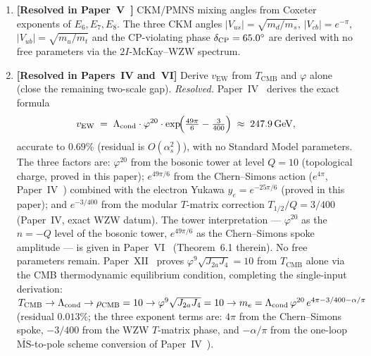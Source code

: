 \documentclass[11pt,a4paper]{article}
\theoremstyle{definition}
\theoremstyle{remark}
\newcommand{\vp}{\varphi}
\newcommand{\Ja}{J_{2a}}
\newcommand{\Jfour}{J_{4}}
\newcommand{\TCMB}{T_{\mathrm{CMB}}}
\newcommand{\vEW}{v_{\mathrm{EW}}}
\newcommand{\Lcond}{\Lambda_{\mathrm{cond}}}
\begin{document}
\begin{enumerate}[noitemsep]
      differently in the tower.
  \item \textbf{[Resolved in Paper~V~\cite{Paper5}]}
    CKM/PMNS mixing angles from Coxeter exponents of $E_6,E_7,E_8$.
    The three CKM angles $|V_{us}|=\sqrt{m_d/m_s}$,
    $|V_{cb}|=e^{-\pi}$, $|V_{ub}|=\sqrt{m_u/m_t}$ and
    the CP-violating phase $\delta_{\rm CP}=65.0^\circ$
    are derived with no free parameters via the $2I$-McKay--WZW spectrum.
  \item \textbf{[Resolved in Papers~IV and~VI]} Derive $\vEW$ from $\TCMB$
    and $\vp$ alone (close the remaining two-scale gap).
    \emph{Resolved.}
    Paper~IV~\cite{Paper4} derives the exact formula
    \begin{equation*}
      \vEW \;=\; \Lcond\cdot\vp^{20}\cdot
      \exp\!\Bigl(\tfrac{49\pi}{6} - \tfrac{3}{400}\Bigr)
      \;\approx\; 247.9\,\mathrm{GeV},
    \end{equation*}
    accurate to $0.69\%$ (residual is $O(\alpha_s^2)$), with no Standard
    Model parameters.
    The three factors are: $\vp^{20}$ from the bosonic tower at level
    $Q=10$ (topological charge, proved in this paper); $e^{49\pi/6}$
    from the Chern--Simons action ($e^{4\pi}$, Paper~IV~\cite{Paper4}) combined with
    the electron Yukawa $y_e=e^{-25\pi/6}$ (proved in this paper); and
    $e^{-3/400}$ from the modular $T$-matrix correction
    $T_{1/2}/Q = 3/400$ (Paper~IV, exact WZW datum).
    The tower interpretation --- $\vp^{20}$ as the $n=-Q$ level of the
    bosonic tower, $e^{49\pi/6}$ as the Chern--Simons spoke amplitude ---
    is given in Paper~VI~\cite{Paper6} (Theorem~6.1 therein).
    No free parameters remain.
    Paper~XII~\cite{Paper12} proves $\vp^9\sqrt{\Ja\Jfour}=10$
    from $\TCMB$ alone via the CMB thermodynamic equilibrium condition,
    completing the single-input derivation:
    $\TCMB\to\Lcond\to\rho_{\rm CMB}=10\to\vp^9\sqrt{\Ja\Jfour}=10
    \to m_e=\Lcond\,\vp^{20}\,e^{4\pi-3/400-\alpha/\pi}$
    (residual $0.013\%$; the three exponent terms are: $4\pi$ from
    the Chern--Simons spoke, $-3/400$ from the WZW $T$-matrix phase,
    and $-\alpha/\pi$ from the one-loop $\overline{\mathrm{MS}}$-to-pole
    scheme conversion of Paper~IV~\cite{Paper4}).
\end{enumerate}

\newpage
\end{document}
